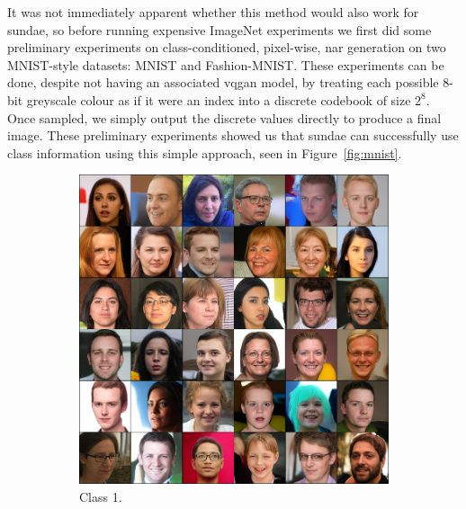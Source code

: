 It was not immediately apparent whether this method would also work for
\gls{sundae}, so before running expensive ImageNet experiments we first did some
preliminary experiments on class-conditioned, pixel-wise, \gls{nar} generation
on two MNIST-style datasets: MNIST and Fashion-MNIST. These experiments can be
done, despite not having an associated \gls{vqgan} model, by treating each
possible 8-bit greyscale colour as if it were an index into a discrete codebook
of size $2^8$. Once sampled, we simply output the discrete values directly to
produce a final image. These preliminary experiments showed us that \gls{sundae}
can successfully use class information using this simple approach, seen in
Figure~\ref{fig:mnist}.

\begin{figure}[ht]
    \centering
    \begin{subfigure}[b]{0.47\textwidth}
        \centering
        \includegraphics[width=1.0\textwidth]{figures/ffhq256-samples-small.png}
        \caption{
            Class 1.
        }
    \end{subfigure}
    \hfill
    \begin{subfigure}[b]{0.47\textwidth}
        \centering

\end{subfigure}
\end{figure}
